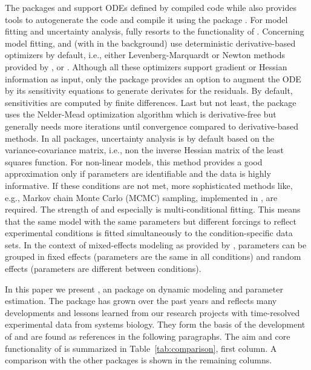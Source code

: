 \documentclass[article]{jss}
\begin{document}
The packages  and  support ODEs defined by compiled code while  also provides tools to autogenerate the  code and compile it using the  package \citep{inline}. For model fitting and uncertainty analysis,  fully resorts to the functionality of .
Concerning model fitting,  and  (with  in the background) use deterministic derivative-based optimizers by default, i.e., either Levenberg-Marquardt or Newton methods provided by ,  or . Although all these optimizers support gradient or Hessian information as input, only the  package provides an option to augment the ODE by its sensitivity equations to generate derivates for the residuals. By default, sensitivities are computed by finite differences. Last but not least, the  package uses the Nelder-Mead optimization algorithm which is derivative-free but generally needs more iterations until convergence compared to derivative-based methods.
In all packages, uncertainty analysis is by default based on the variance-covariance matrix, i.e., non the inverse Hessian matrix of the least squares function. For non-linear models, this method provides a good approximation only if parameters are identifiable and the data is highly informative. If these conditions are not met, more sophisticated methods like, e.g., Markov chain Monte Carlo (MCMC) sampling, implemented in , are required.
The strength of  and especially  is multi-conditional fitting. This means that the same model with the same parameters but different forcings to reflect experimental conditions is fitted simultaneously to the condition-specific data sets. In the context of mixed-effects modeling as provided by , parameters can be grouped in fixed effects (parameters are the same in all conditions) and random effects (parameters are different between conditions).

In this paper we present , an  package on dynamic modeling and parameter estimation. 
The package has grown over the past years and reflects many developments and lessons learned from our research projects with time-resolved experimental data from systems biology. They form the basis of the development of  and are found as references in the following paragraphs. The aim and core functionality of  is summarized in Table~\ref{tab:comparison}, first column. A comparison with the other packages is shown in the remaining columns. 
\end{document}
